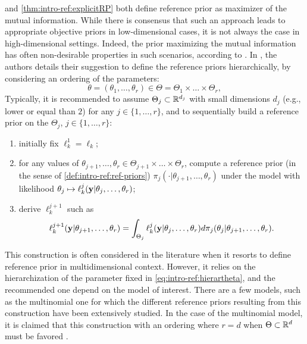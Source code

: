 %


 and \cref{thm:intro-ref:explicitRP}
both define reference prior as maximizer of the mutual information.
While there is consensus that such an approach leads to appropriate objective priors in low-dimensional cases, it is not always the case in high-dimensional settings.
Indeed, the prior maximizing the mutual information has often non-desirable properties in such scenarios, according to \citet{berger_overall_2015}. %
In \cite{berger_development_1992}, the authors details their suggestion to define the reference priors hierarchically, by considering an ordering of the parameters:
 \begin{equation}\label{eq:intro-ref:hierartheta}
     \theta = (\theta_1,\dots,\theta_r) \in \Theta=\Theta_1\times\dots\times\Theta_r,
 \end{equation}
Typically, it is recommended to assume $\Theta_j\subset\mathbb{R}^{d_j}$ with small dimensions $d_j$ (e.g., lower or equal than $2$) for any $j\in\{1,\dots,r\}$, and to sequentially build a reference prior on the $\Theta_j$,  $j\in\{1,\dots,r\}$:
 \begin{enumerate}
     \item initially fix $\ell_k^1=\ell_k$;
     \item for any values of $\theta_{j+1},\dots,\theta_r\in\Theta_{j+1}\times\dots\times\Theta_r$, compute a reference prior (in the sense of \cref{def:intro-ref:ref-priors}) $\pi_j(\cdot|\theta_{j+1},\dots,\theta_r)$ under the model with likelihood $\theta_j\mapsto\ell_k^j(\mathbf{y}|\theta_j,\dots,\theta_r)$;
     \item derive $\ell_k^{j+1}$ such as 
         \begin{equation}\label{eq:hier:condlikeint}
            \ell_k^{j+1}(\mathbf{y}|\theta_{j+1},\dots,\theta_r) =  \int_{\Theta_j}\ell_k^j(\mathbf{y}|\theta_j,\dots,\theta_r)d\pi_j(\theta_j|\theta_{j+1},\dots,\theta_r).
         \end{equation}
 \end{enumerate}


This construction is often considered in the literature when it resorts to define reference prior in multidimensional context. 
However, it relies on the hierarchization of the parameter fixed in \cref{eq:intro-ref:hierartheta}, and the recommended  one depend on the model of interest.
There are a few models, such as the multinomial one for which the different reference priors resulting from this construction have been extensively studied. In the case of the multinomial model, it is claimed that this construction with an ordering where $r=d$ when $\Theta\subset\mathbb{R}^d$ must be favored  \citep{berger_ordered_1992,berger_overall_2015}.




